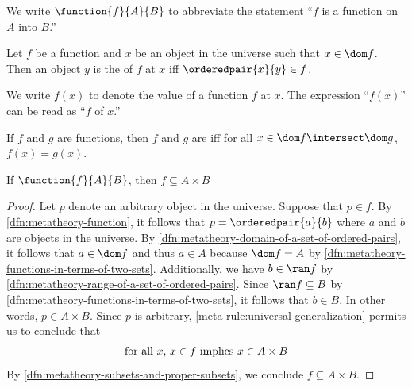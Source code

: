 \begin{notation}
    We write \( \function{f}{A}{B} \) to abbreviate the statement ``\( f \) is a function on \( A \) into \( B \).''
\end{notation}

\begin{dfn}
     \label{dfn:metatheory-value-of-a-function}
    Let \( f \) be a function and \( x \) be an object in the universe such that \( x \in \dom f \).
    Then an object \( y \) is the  of \( f \) at \( x \) iff \( \orderedpair{x}{y} \in f \).
\end{dfn}

\begin{notation}
    We write \( f(x) \) to denote the value of a function \( f \) at \( x \).
    The expression ``\( f(x) \)'' can be read as ``\( f \) of \( x \).''
\end{notation}

\begin{dfn}[Compatibility]
     \label{dfn:metatheory-compatibility-of-two-functions}
    If \( f \) and \( g \) are functions, then \( f \) and \( g \) are  iff for all \( x \in \dom f \intersect \dom g \),
    \( f(x) = g(x) \).
\end{dfn}

\begin{thm}
     \label{thm:metatheory-function-is-subset-of-cartesian-product}
    If \( \function{f}{A}{B} \), then \( f \subseteq A \times B \)
\end{thm}

\begin{proof}
    Let \( p \) denote an arbitrary object in the universe.
    Suppose that \( p \in f \).
    By \cref{dfn:metatheory-function}, it follows that \( p = \orderedpair{a}{b} \) where \( a \) and \( b \) are objects in the universe.
    By \cref{dfn:metatheory-domain-of-a-set-of-ordered-pairs}, it follows that \( a \in \dom f \) and thus \( a \in A \) because \( \dom f = A \)
    by \cref{dfn:metatheory-functions-in-terms-of-two-sets}.
    Additionally, we have \( b \in \ran f \) by \cref{dfn:metatheory-range-of-a-set-of-ordered-pairs}.
    Since \( \ran f \subseteq B \) by \cref{dfn:metatheory-functions-in-terms-of-two-sets}, it follows that \( b \in B \).
    In other words, \( p \in A \times B \).
    Since \( p \) is arbitrary, \cref{meta-rule:universal-generalization} permits us to conclude that
    \begin{equation*}
        \text{for all \( x \), \( x \in f \) implies \( x \in A \times B \)}
    \end{equation*}
    By \cref{dfn:metatheory-subsets-and-proper-subsets}, we conclude \( f \subseteq A \times B \).
\end{proof}

